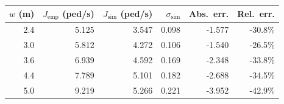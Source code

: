 \begin{tabular}{@{}rrrrrr@{}}
\toprule
$w$ (m) & $J_{\text{emp}}$ (ped/s) & $J_{\text{sim}}$ (ped/s) & $\sigma_{\text{sim}}$ & Abs.\ err. & Rel.\ err. \\
\midrule
2.4 & 5.125 & 3.547 & 0.098 & -1.577 & -30.8\% \\
3.0 & 5.812 & 4.272 & 0.106 & -1.540 & -26.5\% \\
3.6 & 6.939 & 4.592 & 0.169 & -2.348 & -33.8\% \\
4.4 & 7.789 & 5.101 & 0.182 & -2.688 & -34.5\% \\
5.0 & 9.219 & 5.266 & 0.221 & -3.952 & -42.9\% \\
\bottomrule
\end{tabular}
